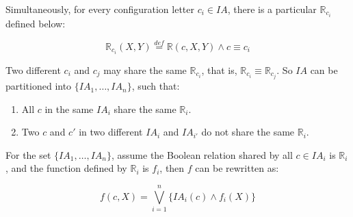 \documentclass[journal]{IEEEtran}
\begin{document}
Simultaneously,
for every configuration letter $c_i\in IA$,
there is a particular $\mathbb{R}_{c_i}$ defined below:

\begin{equation}\label{equ_fdRci}
\mathbb{R}_{c_i}(X,Y)\stackrel{def}{=}\mathbb{R}(c,X,Y) \wedge c\equiv c_i
\end{equation}

%
%
%
%
%
%
Two different $c_i$ and $c_j$ may share the same $\mathbb{R}_{c_i}$,
that is,
$\mathbb{R}_{c_i}\equiv \mathbb{R}_{c_j}$.
%
So $IA$ can be partitioned into $\{IA_1,\dots,IA_n\}$,
such that:
\begin{enumerate}
 \item All $c$ in the same $IA_i$ share the same $\mathbb{R}_i$.
 \item Two $c$ and $c'$ in two different $IA_i$ and $IA_{i'}$ do not share the same $\mathbb{R}_i$.
\end{enumerate}

For the set $\{IA_1,\dots,IA_n\}$,
assume the Boolean relation shared by all $c\in IA_i$ is $\mathbb{R}_i$,
and the function defined by $\mathbb{R}_i$ is $f_i$,
then $f$ can be rewritten as:

\begin{equation}\label{equ_fdfrewagain}
f(c,X)=\bigvee _{i=1}^{n} \{IA_i(c)\wedge f_i(X)\}
\end{equation}
\end{document}
